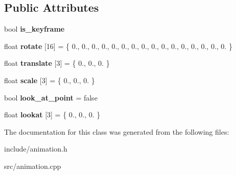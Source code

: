 \subsection*{Public Attributes}
\begin{DoxyCompactItemize}
\item 
\mbox{\label{classframe_a5dcc3ab35351bca7bfd3f2fe916f1651}} 
bool {\bfseries is\+\_\+keyframe}
\item 
\mbox{\label{classframe_abcc53e8268c089969571888bfb2c9ed3}} 
float {\bfseries rotate} \mbox{[}16\mbox{]} = \{ 0., 0., 0., 0., 0., 0., 0., 0., 0., 0., 0., 0., 0., 0., 0., 0. \}
\item 
\mbox{\label{classframe_a041ae59b3f0e599c524c6006e4f46093}} 
float {\bfseries translate} \mbox{[}3\mbox{]} = \{ 0., 0., 0. \}
\item 
\mbox{\label{classframe_aaea81e25dd66cb95c464e0dfe83069d2}} 
float {\bfseries scale} \mbox{[}3\mbox{]} = \{ 0., 0., 0. \}
\item 
\mbox{\label{classframe_a5b0f199fee2c096ea2af30820d57884a}} 
bool {\bfseries look\+\_\+at\+\_\+point} = false
\item 
\mbox{\label{classframe_ac3dd45b414b08e16fb8aa7e6128367d6}} 
float {\bfseries lookat} \mbox{[}3\mbox{]} = \{ 0., 0., 0. \}
\end{DoxyCompactItemize}


The documentation for this class was generated from the following files\+:\begin{DoxyCompactItemize}
\item 
include/animation.\+h\item 
src/animation.\+cpp\end{DoxyCompactItemize}
